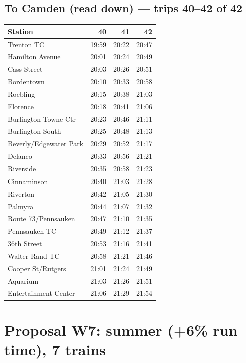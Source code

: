 \subsection*{To Camden (read down) --- trips 40--42 of 42}
\begin{center}\footnotesize\setlength{\tabcolsep}{3pt}\begin{tabular}{@{}lrrr@{}}\toprule
Station & 40 & 41 & 42 \\\midrule
Trenton TC & 19:59 & 20:22 & 20:47 \\
Hamilton Avenue & 20:01 & 20:24 & 20:49 \\
Cass Street & 20:03 & 20:26 & 20:51 \\
Bordentown & 20:10 & 20:33 & 20:58 \\
Roebling & 20:15 & 20:38 & 21:03 \\
Florence & 20:18 & 20:41 & 21:06 \\
Burlington Towne Ctr & 20:23 & 20:46 & 21:11 \\
Burlington South & 20:25 & 20:48 & 21:13 \\
Beverly/Edgewater Park & 20:29 & 20:52 & 21:17 \\
Delanco & 20:33 & 20:56 & 21:21 \\
Riverside & 20:35 & 20:58 & 21:23 \\
Cinnaminson & 20:40 & 21:03 & 21:28 \\
Riverton & 20:42 & 21:05 & 21:30 \\
Palmyra & 20:44 & 21:07 & 21:32 \\
Route 73/Pennsauken & 20:47 & 21:10 & 21:35 \\
Pennsauken TC & 20:49 & 21:12 & 21:37 \\
36th Street & 20:53 & 21:16 & 21:41 \\
Walter Rand TC & 20:58 & 21:21 & 21:46 \\
Cooper St/Rutgers & 21:01 & 21:24 & 21:49 \\
Aquarium & 21:03 & 21:26 & 21:51 \\
Entertainment Center & 21:06 & 21:29 & 21:54 \\
\bottomrule\end{tabular}\end{center}
\clearpage
\section{Proposal W7: summer (+6\% run time), 7 trains}\label{tt:proposal_W7}
